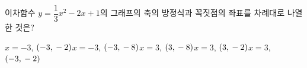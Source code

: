 이차함수 $y=\dfrac{1}{3}x^2-2x+1$의 그래프의 축의 방정식과 꼭짓점의 좌표를 차례대로 나열한 것은?
\begin{choicesii}{$x=-3$, $(-3{,}\mkern3mu -2)$}{$x=-3$, $(-3{,}\mkern3mu -8)$}{$x=3$, $(3{,}\mkern3mu -8)$}{$x=3$, $(3{,}\mkern3mu -2)$}{$x=3$, $(-3{,}\mkern3mu -2)$}\end{choicesii}

